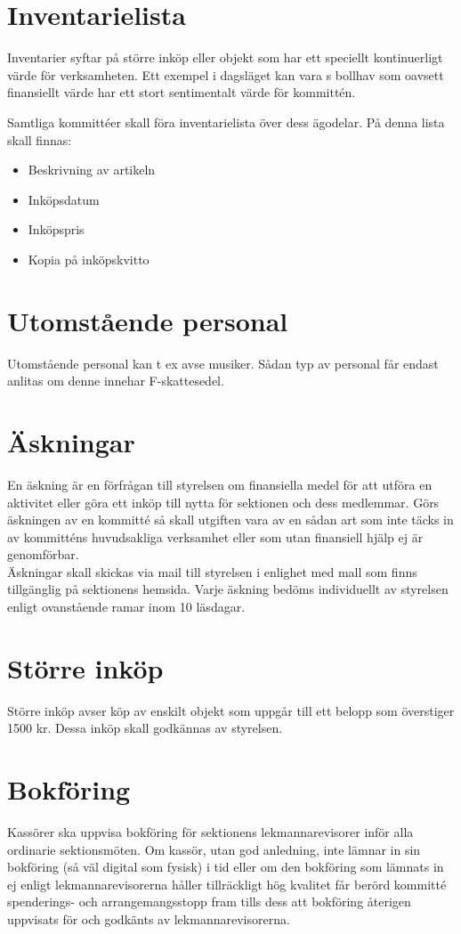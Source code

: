 \documentclass[11pt, includeaddress]{classes/cthit}
\begin{document}
\section{Inventarielista}
Inventarier syftar på större inköp eller objekt som har ett speciellt kontinuerligt värde för verksamheten. Ett exempel i dagsläget kan vara \NOLLKIT{}s bollhav som oavsett finansiellt värde har ett stort sentimentalt värde för kommittén.

Samtliga kommittéer skall föra inventarielista över dess ägodelar. På denna lista skall finnas:

\begin{itemize}
	\item Beskrivning av artikeln
	\item Inköpsdatum
	\item Inköpspris
	\item Kopia på inköpskvitto
\end{itemize}


\section{Utomstående personal}
Utomstående personal kan t ex avse musiker. Sådan typ av personal får endast anlitas om denne innehar F-skattesedel.

\section{Äskningar}
En äskning är en förfrågan till styrelsen om finansiella medel för att utföra en aktivitet eller göra ett inköp till nytta för sektionen och dess medlemmar. Görs äskningen av en kommitté så skall utgiften vara av en sådan art som inte täcks in av kommitténs huvudsakliga verksamhet eller som utan finansiell hjälp ej är genomförbar. \\

Äskningar skall skickas via mail till styrelsen i enlighet med mall som finns tillgänglig på sektionens hemsida. Varje äskning bedöms individuellt av styrelsen enligt ovanstående ramar inom 10 läsdagar.

\section{Större inköp}
Större inköp avser köp av enskilt objekt som uppgår till ett belopp som överstiger 1500 kr. Dessa inköp skall godkännas av styrelsen.

\section{Bokföring}
Kassörer ska uppvisa bokföring för sektionens lekmannarevisorer inför alla ordinarie sektionsmöten. Om kassör, utan god anledning, inte lämnar in sin bokföring (så väl digital som fysisk) i tid eller om den bokföring som lämnats in ej enligt lekmannarevisorerna håller tillräckligt hög kvalitet får berörd kommitté spenderings- och arrangemangsstopp fram tills dess att bokföring återigen uppvisats för och godkänts av lekmannarevisorerna.
\end{document}
